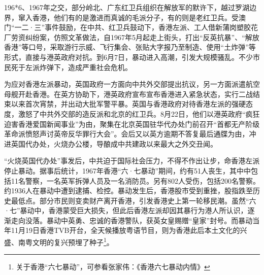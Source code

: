 196*6、1967年之交，部分岭北、广东红卫兵组织在解放军的默许下，越过罗湖边界，窜入香港，他们有的是激进而真诚的毛派分子，有的则是老红卫兵。受澳门“一二·三”事件鼓励，在中共、红卫兵鼓动下，香港左派、工人借新蒲岗塑胶花厂劳资纠纷案，仿照文革做法，自1967年5月起走上街头，打出“反英抗暴”、“解放香港”等口号，采取游行示威、飞行集会、张贴大字报乃至制造、使用“土炸弹”等形式，直接与港英政府对抗。到6月7日，暴动进入高潮，引发大规模骚乱。不少市民死于左派炸弹下，造成严重社会危机。

为应对香港左派暴动，英国政府一方面向中共外交部提出抗议，另一方面派遣航空母舰开赴香港。在英方协助下，港英政府宣布宣布香港进入紧急状态，实行二战结束以来首次宵禁，并出动大批军警平暴。英国与香港政府对待香港左派的强硬态度，激怒了中共外交部的造反派和北京的红卫兵。8月22日，他们以港英政府“疯狂迫害香港爱国新闻事业”为由，聚集在北京英国驻华代办处门前召开“首都无产阶级革命派愤怒声讨英帝反华罪行大会”。会后又以英方逾期不答复最后通牒为由，冲进英国代办处，火烧办公楼，导酿成中共建政以来最大之外交丑闻。

“火烧英国代办处”事发后，中共迫于国际社会压力，不得不作出让步，命香港左派停止暴动。据事后统计，1967年香港“六·七暴动”期间，约有51人丧生，其中中包括11名警察，一名英军拆弹人员及一名消防员。另有802人受伤，包括200名警察。约1936人在暴动中遭到逮捕、检控。暴动发生后，香港股市受到重挫，股指跌至历史最低点。部分市民则变卖财产离开香港，引发香港史上第一轮移民潮。虽然“六·七”暴动中，香港蒙受巨大损失，但此后香港左派却因其暴行为港人所认识，逐渐走向没落。暴动中英勇、忠诚的香港警队，获英女皇赐赠“皇家”封号。而暴动当年11月19日香港TVB开台，全天候播放粤语节目，则为香港此后本土文化的兴盛、南粤文明的复兴预埋了种子\footnote{关于香港“六七暴动”，可参看张家伟：《香港六七暴动内情》}。

